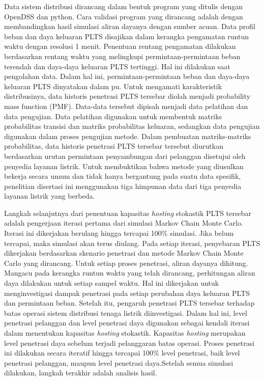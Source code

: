 Data sistem distribusi dirancang dalam bentuk program yang ditulis dengan OpenDSS dan python. Cara validasi program yang dirancang adalah dengan membandingkan hasil simulasi aliran dayanya dengan sumber acuan. Data profil beban dan daya keluaran PLTS disajikan dalam kerangka pengamatan runtun waktu dengan resolusi 1 menit. Penentuan rentang pengamatan dilakukan berdasarkan rentang waktu yang melingkupi permintaan-permintaan beban terendah dan daya-daya keluaran PLTS tertinggi. Hal ini dilakukan saat pengolahan data. Dalam hal ini, permintaan-permintaan beban dan daya-daya keluaran PLTS dinyatakan dalam pu. Untuk mengamati karakteristik distribusinya, data historis penetrasi PLTS tersebar diolah menjadi probability mass function (PMF). Data-data tersebut dipisah menjadi data pelatihan dan data pengujian. Data pelatihan digunakan untuk membentuk matriks probabilitas transisi dan matriks probabilitas keluaran, sedangkan data pengujian digunakan dalam proses pengujian metode. Dalam pembuatan matriks-matriks probabilitas, data historis penetrasi PLTS tersebar tersebut diurutkan berdasarkan urutan permintaan penyambungan dari pelanggan disetujui oleh penyedia layanan listrik. Untuk membuktikan bahwa metode yang diusulkan bekerja secara umum dan tidak hanya bergantung pada suatu data spesifik, penelitian disertasi ini menggunakan tiga himpunan data dari tiga penyedia layanan listrik yang berbeda.

Langkah selanjutnya dari penentuan kapasitas \textit{\textit{hosting}} stokastik PLTS tersebar adalah pengerjaan iterasi pertama dari simulasi Markov Chain Monte Carlo. Iterasi ini dikerjakan berulang hingga tercapai 100\% simulasi. Jika belum tercapai, maka simulasi akan terus diulang. Pada setiap iterasi, penyebaran PLTS dikerjakan berdasarkan skenario penetrasi dan metode Markov Chain Monte Carlo yang dirancang. Untuk setiap proses penetrasi, aliran dayanya dihitung. Mangacu pada kerangka runtun waktu yang telah dirancang, perhitungan aliran daya dilakukan untuk setiap sampel waktu. Hal ini dikerjakan untuk menginvestigasi dampak penetrasi pada setiap perubahan daya keluaran PLTS dan permintaan beban. Setelah itu, pengaruh penetrasi PLTS tersebar terhadap batas operasi sistem distribusi tenaga listrik diinvestigasi. Dalam hal ini, level penetrasi pelanggan dan level penetrasi daya digunakan sebagai kendali iterasi dalam menentukan kapasitas \textit{\textit{hosting}} stokastik. Kapasitas \textit{\textit{hosting}} merupakan level penetrasi daya sebelum terjadi pelanggaran batas operasi. Proses penetrasi ini dilakukan secara iteratif hingga tercapai 100\% level penetrasi, baik level penetrasi pelanggan, maupun level penetrasi daya.Setelah semua simulasi dilakukan, langkah terakhir adalah analisis hasil. 

